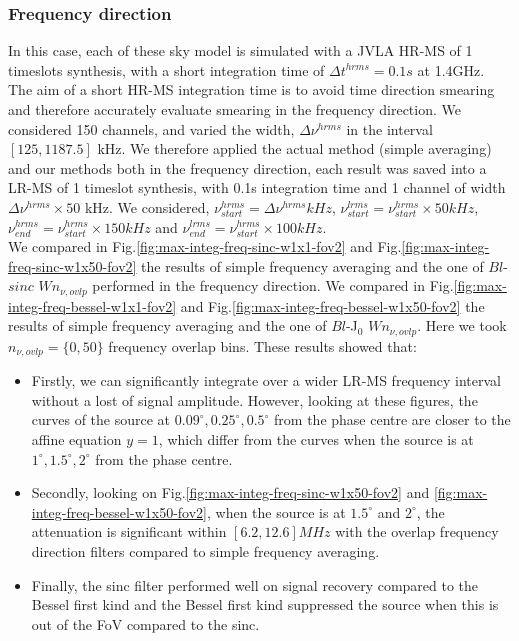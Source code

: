 \documentclass[useAMS,usenatbib]{mn2e}
\begin{document}
\subsubsection{Frequency direction}
In this case, each of these sky model is simulated with a JVLA HR-MS of 1 timeslots synthesis, with a short integration time of $\Delta 
t^{hrms}=0.1s$ at 1.4GHz. The aim of a short HR-MS integration time is to avoid time direction smearing and therefore accurately evaluate
smearing in the frequency direction. We considered 150 channels, and varied the width, $\Delta \nu^{hrms}$ in the interval $[125,1187.5]$ 
kHz.   We therefore applied the actual method 
(simple averaging) and our methods both in the frequency direction, each result was saved into a LR-MS of 1 timeslot synthesis, with 0.1s 
integration time and 1 channel of width $\Delta \nu^{hrms}\times50$ kHz. We considered, $\nu^{hrms}_{start}=\Delta \nu^{hrms}kHz$, 
$\nu^{lrms}_{start}=\nu^{hrms}_{start}\times50 kHz$, $\nu^{hrms}_{end}=\nu^{hrms}_{start}\times150 kHz$ and 
$\nu^{lrms}_{end}=\nu^{hrms}_{start}\times100 kHz$.\\
We compared in Fig.\ref{fig:max-integ-freq-sinc-w1x1-fov2} and Fig.\ref{fig:max-integ-freq-sinc-w1x50-fov2}  the results of simple 
frequency averaging and the one of  $Bl$-$sinc$ $W n_{\nu,ovlp}$ performed in the frequency direction. We compared in 
Fig.\ref{fig:max-integ-freq-bessel-w1x1-fov2} and Fig.\ref{fig:max-integ-freq-bessel-w1x50-fov2} the results of simple 
frequency averaging and the one of  $Bl$-J$_0$ $W n_{\nu,ovlp}$. Here we took $n_{\nu,ovlp}=\{0,50\}$ frequency overlap bins. These results 
showed that:
\begin{itemize}
 \item Firstly,  we can significantly integrate over a wider LR-MS frequency interval without a lost of signal 
amplitude. However, looking at these figures, the curves of the source at $0.09^{\circ},0.25^{\circ},0.5^{\circ}$ from the phase centre are 
closer to the affine equation $y=1$, which differ from the curves when the source is at $1^{\circ},1.5^{\circ}, 2^{\circ}$ from the phase 
centre.  
 \item Secondly, looking on Fig.\ref{fig:max-integ-freq-sinc-w1x50-fov2} and 
\ref{fig:max-integ-freq-bessel-w1x50-fov2}, when the source is at $1.5^{\circ}$ and $2^{\circ}$, the attenuation is significant within 
$[6.2,12.6]MHz$ with the overlap frequency direction filters compared to simple frequency averaging.
 \item Finally, the sinc filter performed well on signal recovery compared to the Bessel first kind and the Bessel first kind suppressed 
the 
source when this is out of the FoV compared to the sinc.  
\end{itemize}
\end{document}
